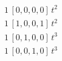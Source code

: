 \begin{align*}
1\,[0,0,0,0]\,t^{2} \\
1\,[1,0,0,1]\,t^{2} \\
1\,[0,1,0,0]\,t^{3} \\
1\,[0,0,1,0]\,t^{3}
\end{align*}
